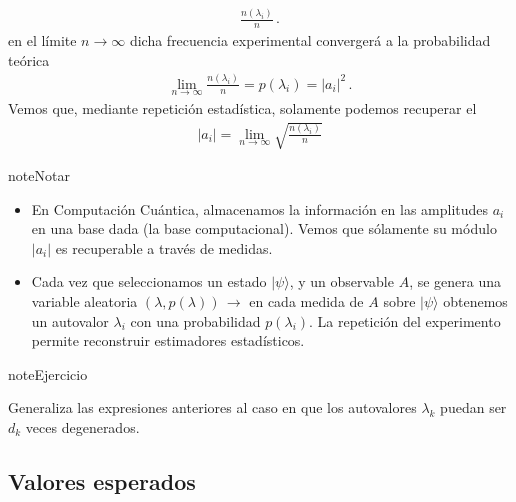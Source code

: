 \documentclass[letterpaper,10pt,english]{jupyterBook}
\newcommand{\ket}[1]{|#1\rangle}
\begin{document}
\begin{equation*}
\begin{split}
\frac{n(\lambda_i)}{n}\, .
\end{split}
\end{equation*}
\sphinxAtStartPar
en el límite \(n\to \infty\) dicha frecuencia experimental convergerá a la probabilidad teórica
\begin{equation*}
\begin{split}
\lim_{n\to\infty} \frac{n(\lambda_i)}{n} =  p(\lambda_i)  = |a_i|^2   \, .
\end{split}
\end{equation*}
\sphinxAtStartPar
Vemos que, mediante repetición estadística, solamente podemos recuperar el 
\begin{equation*}
\begin{split}
|a_i| = \lim_{n\to\infty} \sqrt{\frac{n(\lambda_i)}{n} }
\end{split}
\end{equation*}
\begin{sphinxadmonition}{note}{Notar}
\begin{itemize}
\item {} 
\sphinxAtStartPar
En Computación Cuántica, almacenamos la información en las amplitudes \(a_i\) en una base dada (la base computacional). Vemos que sólamente su módulo \(|a_i|\) es recuperable a través de medidas.

\item {} 
\sphinxAtStartPar
Cada vez que seleccionamos un estado \(\ket{\psi}\), y un observable \(A\), se genera una variable aleatoria \((\lambda,p(\lambda))\, \to \) en cada medida de \(A\) sobre \(\ket{\psi}\) obtenemos un autovalor \(\lambda_i\) con una probabilidad \(p(\lambda_i)\).
La repetición del experimento permite reconstruir estimadores estadísticos.

\end{itemize}
\end{sphinxadmonition}

\begin{sphinxadmonition}{note}{Ejercicio}

\sphinxAtStartPar
Generaliza las expresiones anteriores al caso en que los autovalores \(\lambda_k\) puedan ser  \(d_k\) veces degenerados.
\end{sphinxadmonition}


\subsection{Valores esperados}
\label{\detokenize{docs/Part_01_Formalismo/Chapter_02_01_Fundamentos_MC_myst:valores-esperados}}
\sphinxAtStartPar
\end{document}
